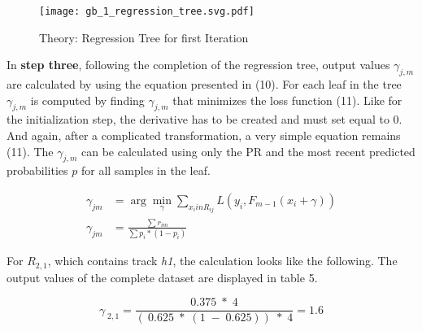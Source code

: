 \begin{figure}[H]
    \centering
    \caption[]{Theory: Regression Tree for first Iteration}
	\label{gb_1_regression_tree}
    \texttt{[image: gb\_1\_regression\_tree.svg.pdf]}
\end{figure}

In \textbf{step three}, following the completion of the regression tree, output values \(\gamma_{j, m}\) are calculated by using 
the equation presented in (10). For each leaf in the tree \(\gamma_{j, m}\) is computed by finding 
\(\gamma_{j, m}\) that minimizes the loss function (11). Like for the initialization step, the derivative has 
to be created and must set equal to \(0\). And again, after a complicated transformation, a very simple 
equation remains (11). The \(\gamma_{j, m}\)  can be calculated using only the \ac{PR} and the most 
recent predicted probabilities \(p\) for all samples in the leaf. 

\begin{equation}
    \begin{aligned}
        \gamma_{jm} &= \arg \min_{\gamma}\sum_{x_{i} in R_{ij}} L(y_{i},F_{m-1}(x_{i} + \gamma))
        \\
        \gamma_{jm} &= \frac{ \sum r_{im}}{\sum p_{i} * (1 - p_{i})}
    \end{aligned}
\end{equation}

For \(R_{2,1}\), which contains track \emph{h1}, the calculation looks like the following. The output values of the complete 
dataset are displayed in table 5. 

\begin{equation*}
\gamma_{\;2,1} = \frac{0.375\;*\;4}{(\:0.625\;*\;(1\;-\;0.625))\;*\;4} = 1.6 
\end{equation*}


